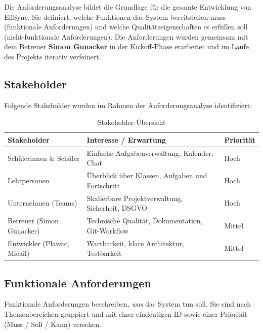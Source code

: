 
Die Anforderungsanalyse bildet die Grundlage für die gesamte Entwicklung
von EffSync. Sie definiert, welche Funktionen das System bereitstellen
muss (funktionale Anforderungen) und welche Qualitätseigenschaften es
erfüllen soll (nicht-funktionale Anforderungen). Die Anforderungen wurden
gemeinsam mit dem Betreuer \textbf{Simon Gunacker} in der Kickoff-Phase
erarbeitet und im Laufe des Projekts iterativ verfeinert.

\subsection{Stakeholder}

Folgende Stakeholder wurden im Rahmen der Anforderungsanalyse identifiziert:

\begin{table}[H]
    \centering
    \caption{Stakeholder-Übersicht}
    \begin{tabularx}{\textwidth}{lXl}
        \toprule
        \textbf{Stakeholder} & \textbf{Interesse / Erwartung}
          & \textbf{Priorität} \\
        \midrule
        Schülerinnen \& Schüler
          & Einfache Aufgabenverwaltung, Kalender, Chat
          & Hoch \\
        Lehrpersonen
          & Überblick über Klassen, Aufgaben und Fortschritt
          & Hoch \\
        Unternehmen (Teams)
          & Skalierbare Projektverwaltung, Sicherheit, DSGVO
          & Hoch \\
        Betreuer (Simon Gunacker)
          & Technische Qualität, Dokumentation, Git-Workflow
          & Mittel \\
        Entwickler (Plavsic, Micail)
          & Wartbarkeit, klare Architektur, Testbarkeit
          & Mittel \\
        \bottomrule
    \end{tabularx}
    \label{tab:stakeholder}
\end{table}

\subsection{Funktionale Anforderungen}
\label{sec:funktionale-anforderungen}

Funktionale Anforderungen beschreiben, \textit{was} das System tun soll.
Sie sind nach Themenbereichen gruppiert und mit einer eindeutigen ID
sowie einer Priorität (Muss / Soll / Kann) versehen.

